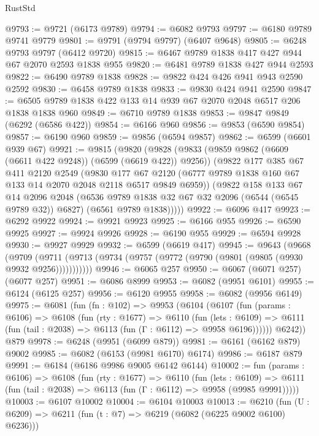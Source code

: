 \begin{lexlean}{RustStd}
\begin{coremodule}
@9793 := @9721 (@6173 @9789)
@9794 := @6082 @9793
@9797 := @6180 @9789 @9741 @9779
@9801 := @9791 (@9794 @9797) (@6407 @9648)
@9805 := @6248 @9793 @9797 (@6412 @9720)
@9815 := @6467 @9789 @1838 @417 @427 @944 @67 @2070 @2593 @1838 @955
@9820 := @6481 @9789 @1838 @427 @944 @2593
@9822 := @6490 @9789 @1838
@9828 := @9822 @424 @426 @941 @943 @2590 @2592
@9830 := @6458 @9789 @1838
@9833 := @9830 @424 @941 @2590
@9847 := @6505 @9789 @1838 @422 @133 @14 @939 @67 @2070 @2048 @6517 @206 @1838 @1838 @960
@9849 := @6710 @9789 @1838
@9853 := @9847 @9849 (@6292 (@6586 @422))
@9854 := @6166 @960
@9856 := @9853 (@6590 @9854)
@9857 := @6190 @960
@9859 := @9856 (@6594 @9857)
@9862 := @6599 (@6601 @939 @67)
@9921 := @9815
    (@9820
      (@9828
        (@9833 (@9859 @9862 (@6609 (@6611 @422 @9248)) (@6599 (@6619 @422)) @9256))
        (@9822
          @177
          @385
          @67
          @411
          @2120
          @2549
          (@9830
            @177
            @67
            @2120
            (@6777 @9789 @1838 @160 @67 @133 @14 @2070 @2048 @2118 @6517 @9849 @6959))
          (@9822
            @158
            @133
            @67
            @14
            @2096
            @2048
            (@6536 @9789 @1838 @32 @67 @32 @2096 (@6544 (@6545 @9789 @32)) @6827)
            (@6561 @9789 @1838)))))
@9922 := @6096 @417
@9923 := @6292 @9922
@9924 := @9921 @9923
@9925 := @6166 @955
@9926 := @6590 @9925
@9927 := @9924 @9926
@9928 := @6190 @955
@9929 := @6594 @9928
@9930 := @9927 @9929
@9932 := @6599 (@6619 @417)
@9945 := @9643
    (@9668
      (@9709 (@9711 (@9713 (@9734 (@9757 (@9772 (@9790 (@9801 (@9805 (@9930 @9932 @9256)))))))))))
@9946 := @6065 @257
@9950 := @6067 (@6071 @257) (@6077 @257)
@9951 := @6086 @8999
@9953 := @6082 (@9951 @6101)
@9955 := @6124 (@6125 @257)
@9956 := @6120 @9955
@9958 := @6082 (@9956 @6149)
@9975 := @6081
    (fun (fn : @102) =>
    @9953
      (@6104
        (@6107
          (fun (params : @6106) =>
          @6108
            (fun (rty : @1677) =>
            @6110
              (fun (lets : @6109) =>
              @6111 (fun (tail : @2038) => @6113 (fun (Γ : @6112) => @9958 @6196))))))
        @6242))
    @879
@9978 := @6248 (@9951 (@6099 @879))
@9981 := @6161 (@6162 @879) @9002
@9985 := @6082 (@6153 (@9981 @6170) @6174)
@9986 := @6187 @879
@9991 := @6184 (@6186 @9986 @9005 @6142 @6144)
@10002 := fun (params : @6106) =>
  @6108
    (fun (rty : @1677) =>
    @6110
      (fun (lets : @6109) =>
      @6111 (fun (tail : @2038) => @6113 (fun (Γ : @6112) => @9958 (@9985 @9991)))))
@10003 := @6107 @10002
@10004 := @6104 @10003
@10013 := @6210 (fun (U : @6209) => @6211 (fun (t : @7) => @6219 (@6082 (@6225 @9002 @6100) @6236)))

\end{coremodule}
\end{lexlean}
